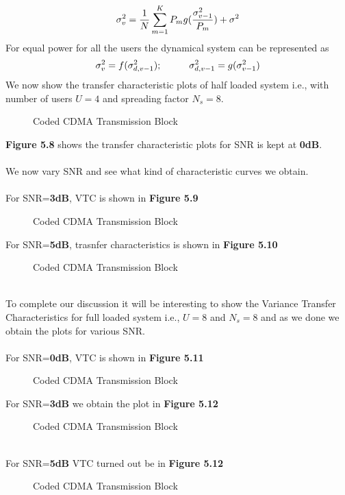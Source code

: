 \begin{equation}
\sigma_v^2=\frac{\hbox{$1$}}{\hbox{$N$}}\sum\limits_{m=1}^{K}P_mg(\frac{\hbox{$\sigma_{v-1}^2$}}{\hbox{$P_m$}})+\sigma^2
\end{equation}
For equal power for all the users the dynamical system can be represented as
\begin{equation}
\sigma_v^2=f(\sigma^2_{d,v-1}); \hspace{10mm} \sigma^2_{d,v-1}=g(\sigma^2_{v-1})
\end{equation}
\newpage
We now show the transfer characteristic plots of half loaded system i.e., with number of users $U=4$ and spreading factor $N_s=8$. 
\begin{figure}[htb]
\centerline{  }
\caption{Coded CDMA Transmission Block}
\end{figure}
\textbf{Figure 5.8} shows the transfer characteristic plots for SNR is kept at \textbf{0dB}.\\ \\
We now vary SNR and see what kind of characteristic curves we obtain. \\ \\
For SNR=\textbf{3dB}, VTC is shown in \textbf{Figure 5.9}
\begin{figure}[htb]
\centerline{  }
\caption{Coded CDMA Transmission Block}
\end{figure}
\newpage
For SNR=\textbf{5dB}, trasnfer characteristics is shown in \textbf{Figure 5.10}
\begin{figure}[htb]
\centerline{  }
\caption{Coded CDMA Transmission Block}
\end{figure}\\
To complete our discussion it will be interesting to show the Variance Transfer Characteristics for full loaded system i.e., $U=8$ and $N_s=8$ and as we done we obtain the plots for various SNR.\\ \\
For SNR=\textbf{0dB}, VTC is shown in \textbf{Figure 5.11}
\begin{figure}[htb]
\centerline{  }
\caption{Coded CDMA Transmission Block}
\end{figure}
\newpage
For SNR=\textbf{3dB} we obtain the plot in \textbf{Figure 5.12}
\begin{figure}[htb]
\centerline{  }
\caption{Coded CDMA Transmission Block}
\end{figure}\\
For SNR=\textbf{5dB} VTC turned out be in \textbf{Figure 5.12}
\begin{figure}[htb]
\centerline{  }
\caption{Coded CDMA Transmission Block}
\end{figure}\\
